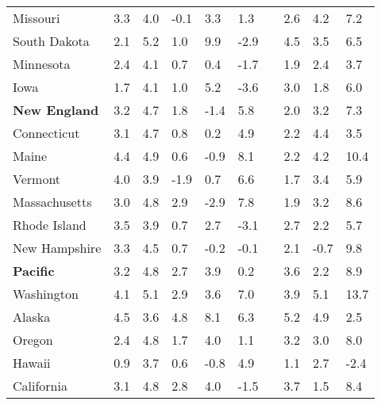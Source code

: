 {\begin{tabular}{p{29mm} R{8.5mm} R{8.5mm} R{8.5mm} R{8.5mm} 
             R{8.5mm} p{0mm} R{11mm} R{11mm} R{12mm} }
\hspace{3mm}  Missouri  & 3.3 & 4.0 & -0.1 & 3.3 & 1.3 &  & 2.6 & 4.2 & 7.2 \\
\hspace{3mm}  South Dakota  & 2.1 & 5.2 & 1.0 & 9.9 & -2.9 &  & 4.5 & 3.5 & 6.5 \\
\hspace{3mm}  Minnesota  & 2.4 & 4.1 & 0.7 & 0.4 & -1.7 &  & 1.9 & 2.4 & 3.7 \\
\hspace{3mm}  Iowa  & 1.7 & 4.1 & 1.0 & 5.2 & -3.6 &  & 3.0 & 1.8 & 6.0 \\
\hspace{1mm} \textbf{New England}  & 3.2 & 4.7 & 1.8 & -1.4 & 5.8 &  & 2.0 & 3.2 & 7.3 \\
\hspace{3mm}  Connecticut  & 3.1 & 4.7 & 0.8 & 0.2 & 4.9 &  & 2.2 & 4.4 & 3.5 \\
\hspace{3mm}  Maine  & 4.4 & 4.9 & 0.6 & -0.9 & 8.1 &  & 2.2 & 4.2 & 10.4 \\
\hspace{3mm}  Vermont  & 4.0 & 3.9 & -1.9 & 0.7 & 6.6 &  & 1.7 & 3.4 & 5.9 \\
\hspace{3mm}  Massachusetts  & 3.0 & 4.8 & 2.9 & -2.9 & 7.8 &  & 1.9 & 3.2 & 8.6 \\
\hspace{3mm}  Rhode Island  & 3.5 & 3.9 & 0.7 & 2.7 & -3.1 &  & 2.7 & 2.2 & 5.7 \\
\hspace{3mm}  New Hampshire  & 3.3 & 4.5 & 0.7 & -0.2 & -0.1 &  & 2.1 & -0.7 & 9.8 \\
\hspace{1mm} \textbf{Pacific}  & 3.2 & 4.8 & 2.7 & 3.9 & 0.2 &  & 3.6 & 2.2 & 8.9 \\
\hspace{3mm}  Washington  & 4.1 & 5.1 & 2.9 & 3.6 & 7.0 &  & 3.9 & 5.1 & 13.7 \\
\hspace{3mm}  Alaska  & 4.5 & 3.6 & 4.8 & 8.1 & 6.3 &  & 5.2 & 4.9 & 2.5 \\
\hspace{3mm}  Oregon  & 2.4 & 4.8 & 1.7 & 4.0 & 1.1 &  & 3.2 & 3.0 & 8.0 \\
\hspace{3mm}  Hawaii  & 0.9 & 3.7 & 0.6 & -0.8 & 4.9 &  & 1.1 & 2.7 & -2.4 \\
\hspace{3mm}  California  & 3.1 & 4.8 & 2.8 & 4.0 & -1.5 &  & 3.7 & 1.5 & 8.4 \\

\end{tabular}}
